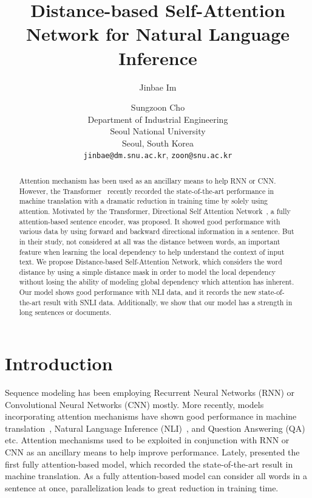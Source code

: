 \documentclass[11pt,letterpaper]{article}
\title{Distance-based Self-Attention Network for Natural Language Inference}
\author{Jinbae Im \and Sungzoon Cho \\
        Department of Industrial Engineering \\
        Seoul National University \\
        Seoul, South Korea \\
  {\tt jinbae@dm.snu.ac.kr}, {\tt zoon@snu.ac.kr}}
\date{}
\begin{document}
\maketitle

\begin{abstract}
Attention mechanism has been used as an ancillary means to help RNN or CNN. However, the Transformer~\citep{AttentionAYN} recently recorded the state-of-the-art performance in machine translation with a dramatic reduction in training time by solely using attention. Motivated by the Transformer, Directional Self Attention Network~\citep{DiSAN}, a fully attention-based sentence encoder, was proposed. It showed good performance with various data by using forward and backward directional information in a sentence. But in their study, not considered at all was the distance between words, an important feature when learning the local dependency to help understand the context of input text. We propose Distance-based Self-Attention Network, which considers the word distance by using a simple distance mask in order to model the local dependency without losing the ability of modeling global dependency which attention has inherent. Our model shows good performance with NLI data, and it records the new state-of-the-art result with SNLI data. Additionally, we show that our model has a strength in long sentences or documents.
\end{abstract}



\section{Introduction}

Sequence modeling has been employing Recurrent Neural Networks (RNN) or Convolutional Neural Networks (CNN) mostly. More recently, models incorporating attention mechanisms have shown good performance in machine translation~\citep{NMT1,NMT2}, Natural Language Inference (NLI)~\citep{NLI_INNER}, and Question Answering (QA)~\citep{QA_1,QA_2} etc. Attention mechanisms used to be exploited in conjunction with RNN or CNN as an ancillary means to help improve performance. Lately, \citet{AttentionAYN} presented the first fully attention-based model, which recorded the state-of-the-art result in machine translation. As a fully attention-based model can consider all words in a sentence at once, parallelization leads to great reduction in training time.
\end{document}

